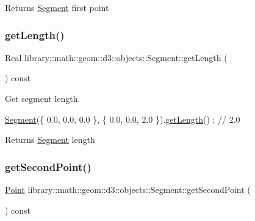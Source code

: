 \begin{DoxyReturn}{Returns}
\hyperlink{classlibrary_1_1math_1_1geom_1_1d3_1_1objects_1_1_segment}{Segment} first point 
\end{DoxyReturn}
\mbox{\label{classlibrary_1_1math_1_1geom_1_1d3_1_1objects_1_1_segment_a16b011c680e3102b8b44e6c88ffff81d}} 
\subsubsection{\texorpdfstring{get\+Length()}{getLength()}}
{\footnotesize\ttfamily Real library\+::math\+::geom\+::d3\+::objects\+::\+Segment\+::get\+Length (\begin{DoxyParamCaption}{ }\end{DoxyParamCaption}) const}



Get segment length. 


\begin{DoxyCode}
\hyperlink{classlibrary_1_1math_1_1geom_1_1d3_1_1objects_1_1_segment_a5562342d1edf2f52e37ce1bc138ee7d7}{Segment}(\{ 0.0, 0.0, 0.0 \}, \{ 0.0, 0.0, 2.0 \}).\hyperlink{classlibrary_1_1math_1_1geom_1_1d3_1_1objects_1_1_segment_a16b011c680e3102b8b44e6c88ffff81d}{getLength}() ; \textcolor{comment}{// 2.0}
\end{DoxyCode}


\begin{DoxyReturn}{Returns}
\hyperlink{classlibrary_1_1math_1_1geom_1_1d3_1_1objects_1_1_segment}{Segment} length 
\end{DoxyReturn}
\mbox{\label{classlibrary_1_1math_1_1geom_1_1d3_1_1objects_1_1_segment_a5d824fed334185975226d8f7e8489ced}} 
\subsubsection{\texorpdfstring{get\+Second\+Point()}{getSecondPoint()}}
{\footnotesize\ttfamily \hyperlink{classlibrary_1_1math_1_1geom_1_1d3_1_1objects_1_1_point}{Point} library\+::math\+::geom\+::d3\+::objects\+::\+Segment\+::get\+Second\+Point (\begin{DoxyParamCaption}{ }\end{DoxyParamCaption}) const}



